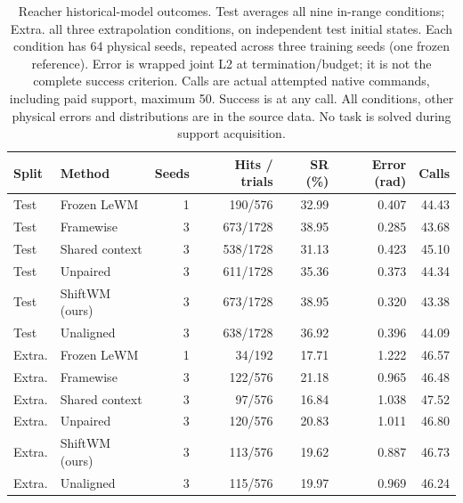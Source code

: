 \begin{table}[tbp]
\centering\fontsize{9}{10.5}\selectfont
\setlength{\tabcolsep}{3pt}
\begin{tabular}{llrrrrr}
\toprule
Split & Method & Seeds & Hits / trials & SR (\%) & Error (rad) & Calls \\
\midrule
Test & Frozen LeWM & 1 & 190/576 & 32.99 & 0.407 & 44.43 \\
Test & Framewise & 3 & 673/1728 & 38.95 & 0.285 & 43.68 \\
Test & Shared context & 3 & 538/1728 & 31.13 & 0.423 & 45.10 \\
Test & Unpaired & 3 & 611/1728 & 35.36 & 0.373 & 44.34 \\
Test & ShiftWM (ours) & 3 & 673/1728 & 38.95 & 0.320 & 43.38 \\
Test & Unaligned & 3 & 638/1728 & 36.92 & 0.396 & 44.09 \\
Extra. & Frozen LeWM & 1 & 34/192 & 17.71 & 1.222 & 46.57 \\
Extra. & Framewise & 3 & 122/576 & 21.18 & 0.965 & 46.48 \\
Extra. & Shared context & 3 & 97/576 & 16.84 & 1.038 & 47.52 \\
Extra. & Unpaired & 3 & 120/576 & 20.83 & 1.011 & 46.80 \\
Extra. & ShiftWM (ours) & 3 & 113/576 & 19.62 & 0.887 & 46.73 \\
Extra. & Unaligned & 3 & 115/576 & 19.97 & 0.969 & 46.24 \\
\bottomrule\end{tabular}
\caption{Reacher historical-model outcomes. Test averages all nine in-range conditions; Extra. all three extrapolation conditions, on independent test initial states. Each condition has 64 physical seeds, repeated across three training seeds (one frozen reference). Error is wrapped joint L2 at termination/budget; it is not the complete success criterion. Calls are actual attempted native commands, including paid support, maximum 50. Success is at any call. All conditions, other physical errors and distributions are in the source data. No task is solved during support acquisition.}
\label{tab:physical-reacher}
\end{table}

